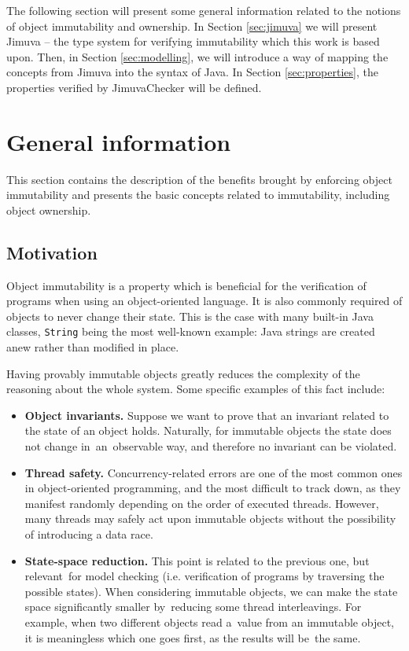 \documentclass{pracamgr}
\theoremstyle{break}
\theoremstyle{break}
\theoremstyle{break}
\begin{document}
The following section will present some general information related to
the notions of object immutability and ownership. In Section
\ref{sec:jimuva} we will present Jimuva -- the type system for
verifying immutability which this work is based upon. Then, in Section
\ref{sec:modelling}, we will introduce a way of mapping the concepts
from Jimuva into the syntax of Java. In Section \ref{sec:properties},
the properties verified by JimuvaChecker will be defined.

\section{General information}
\label{sec:imm-general}

This section contains the description of the benefits brought by
enforcing object immutability and presents the basic concepts related
to immutability, including object ownership.

\subsection{Motivation}

Object immutability is a property which is beneficial for the
verification of programs when using an object-oriented language. It is
also commonly required of objects to never change their state. This is
the case with many built-in Java classes, \texttt{String} being the
most well-known example: Java strings are created anew rather than
modified in place.

Having provably immutable objects greatly reduces the complexity of
the reasoning about the whole system. Some specific examples of this
fact include: 
\begin{itemize}
\item \textbf{Object invariants.} Suppose we want to prove that an
  invariant related to the state of an object holds. Naturally, for
  immutable objects the state does not change in~an~observable way,
  and therefore no invariant can be violated.
\item \textbf{Thread safety.} Concurrency-related errors are one of
  the most common ones in object-oriented programming, and the most
  difficult to track down, as they manifest randomly depending on the
  order of executed threads. However, many threads may safely act upon
  immutable objects without the possibility of introducing a data race.
\item \textbf{State-space reduction.} This point is related to the
  previous one, but relevant~for model checking (i.e. verification of
  programs by traversing the possible states). When considering
  immutable objects, we can make the state space significantly smaller
  by~reducing some thread interleavings. For example, when two
  different objects read a~value from an immutable object, it is
  meaningless which one goes first, as the results will be~the same.
\end{itemize}
\end{document}

